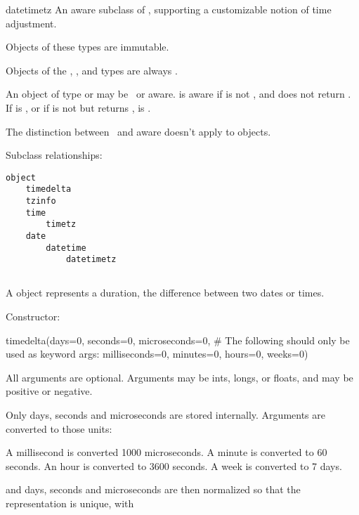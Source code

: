 \begin{classdesc*}{datetimetz}
  An aware subclass of , supporting a customizable notion of
  time adjustment.
\end{classdesc*}

Objects of these types are immutable.

Objects of the , , and  types
are always \naive.

An object  of type  or  may be
\naive\ or aware.   is aware if  is not
, and  does not return
.  If  is , or if 
is not  but  returns
,  is \naive.

The distinction between \naive\ and aware doesn't apply to
 objects.

Subclass relationships:

\begin{verbatim}
object
    timedelta
    tzinfo
    time
        timetz
    date
        datetime
            datetimetz
\end{verbatim}

\subsection{ \label{datetime-timedelta}}

A  object represents a duration, the difference
between two dates or times.

Constructor:

    timedelta(days=0, seconds=0, microseconds=0,
              \# The following should only be used as keyword args:
              milliseconds=0, minutes=0, hours=0, weeks=0)

    All arguments are optional.  Arguments may be ints, longs, or floats,
    and may be positive or negative.

    Only days, seconds and microseconds are stored internally.  Arguments
    are converted to those units:

        A millisecond is converted 1000 microseconds.
        A minute is converted to 60 seconds.
        An hour is converted to 3600 seconds.
        A week is converted to 7 days.

    and days, seconds and microseconds are then normalized so that the
    representation is unique, with

